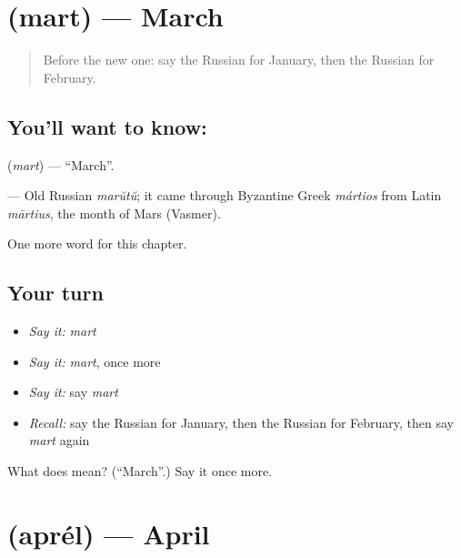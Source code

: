 \section[\texorpdfstring{\ru{март} (mart)}{март (mart)}]{ (mart) — March}

\label{lesson:RU-C181-mart}



\begin{quote}
Before the new one: say the Russian for January, then the Russian for February.
\end{quote}

\subsection*{You'll want to know: }
\textbf{} (\emph{mart}) — \textquotedblleft{}March\textquotedblright{}.

\begin{cousinweb}
\textbf{} — Old Russian \emph{marŭtŭ}; it came through Byzantine Greek \emph{mártios} from Latin \emph{mārtius}, the month of Mars (Vasmer).
\end{cousinweb}

\begin{grammarlens}[title={What you've built}]
One more word for this chapter.
\end{grammarlens}

\subsection*{Your turn}
\begin{itemize}
\raggedright
  \item \emph{Say it:} \emph{mart}
  \item \emph{Say it:} \emph{mart}, once more
  \item \emph{Say it:} say \emph{mart}
  \item \emph{Recall:} say the Russian for January, then the Russian for February, then say \emph{mart} again
\end{itemize}

\begin{tcolorbox}[breakable,colback=teal!4,colframe=teal!35!black,title={Before you move on}]
What does  mean? (\textquotedblleft{}March\textquotedblright{}.) Say it once more.
\end{tcolorbox}
\section[\texorpdfstring{\ru{апрель} (aprél)}{апрель (aprél)}]{ (aprél) — April}

